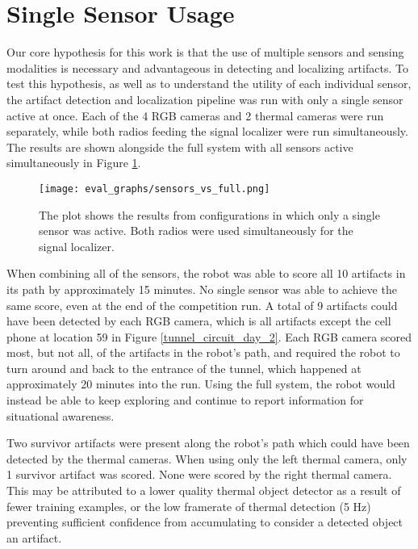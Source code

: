 \section{Single Sensor Usage}

Our core hypothesis for this work is that the use of multiple sensors and sensing modalities is necessary and advantageous in detecting and localizing artifacts. To test this hypothesis, as well as to understand the utility of each individual sensor, the artifact detection and localization pipeline was run with only a single sensor active at once. Each of the 4 RGB cameras and 2 thermal cameras were run separately, while both radios feeding the signal localizer were run simultaneously. The results are shown alongside the full system with all sensors active simultaneously in Figure \ref{sensors_vs_full}.

\begin{figure}	
	\centering
	\texttt{[image: eval\_graphs/sensors\_vs\_full.png]}
	\caption[Single sensor artifact localization]{The plot shows the results from configurations in which only a single sensor was active. Both radios were used simultaneously for the signal localizer.}
	\label{sensors_vs_full}
\end{figure}

When combining all of the sensors, the robot was able to score all 10 artifacts in its path by approximately 15 minutes. No single sensor was able to achieve the same score, even at the end of the competition run. A total of 9 artifacts could have been detected by each RGB camera, which is all artifacts except the cell phone at location 59 in Figure \ref{tunnel_circuit_day_2}. Each RGB camera scored most, but not all, of the artifacts in the robot's path, and required the robot to turn around and back to the entrance of the tunnel, which happened at approximately 20 minutes into the run. Using the full system, the robot would instead be able to keep exploring and continue to report information for situational awareness. 

Two survivor artifacts were present along the robot's path which could have been detected by the thermal cameras. When using only the left thermal camera, only 1 survivor artifact was scored. None were scored by the right thermal camera. This may be attributed to a lower quality thermal object detector as a result of fewer training examples, or the low framerate of thermal detection (5 Hz) preventing sufficient confidence from accumulating to consider a detected object an artifact.

